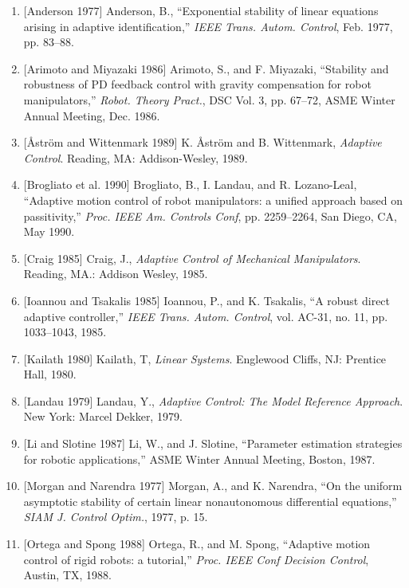 \documentclass[12pt,a4paper]{ctexart}
\begin{document}
\begin{enumerate}
\item {[Anderson 1977]} Anderson, B., ``Exponential stability of linear equations arising in adaptive identification,'' \textit{IEEE Trans. Autom. Control}, Feb. 1977, pp. 83--88.

\item {[Arimoto and Miyazaki 1986]} Arimoto, S., and F. Miyazaki, ``Stability and robustness of PD feedback control with gravity compensation for robot manipulators,'' \textit{Robot. Theory Pract.}, DSC Vol. 3, pp. 67--72, ASME Winter Annual Meeting, Dec. 1986.

\item {[Åström and Wittenmark 1989]} K. Åström and B. Wittenmark, \textit{Adaptive Control}. Reading, MA: Addison-Wesley, 1989.

\item {[Brogliato et al. 1990]} Brogliato, B., I. Landau, and R. Lozano-Leal, ``Adaptive motion control of robot manipulators: a unified approach based on passitivity,'' \textit{Proc. IEEE Am. Controls Conf}, pp. 2259--2264, San Diego, CA, May 1990.

\item {[Craig 1985]} Craig, J., \textit{Adaptive Control of Mechanical Manipulators}. Reading, MA.: Addison Wesley, 1985.

\item {[Ioannou and Tsakalis 1985]} Ioannou, P., and K. Tsakalis, ``A robust direct adaptive controller,'' \textit{IEEE Trans. Autom. Control}, vol. AC-31, no. 11, pp. 1033--1043, 1985.

\item {[Kailath 1980]} Kailath, T, \textit{Linear Systems}. Englewood Cliffs, NJ: Prentice Hall, 1980.

\item {[Landau 1979]} Landau, Y., \textit{Adaptive Control: The Model Reference Approach}. New York: Marcel Dekker, 1979.

\item {[Li and Slotine 1987]} Li, W., and J. Slotine, ``Parameter estimation strategies for robotic applications,'' ASME Winter Annual Meeting, Boston, 1987.

\item {[Morgan and Narendra 1977]} Morgan, A., and K. Narendra, ``On the uniform asymptotic stability of certain linear nonautonomous differential equations,'' \textit{SIAM J. Control Optim.}, 1977, p. 15.

\item {[Ortega and Spong 1988]} Ortega, R., and M. Spong, ``Adaptive motion control of rigid robots: a tutorial,'' \textit{Proc. IEEE Conf Decision Control}, Austin, TX, 1988.


\end{enumerate}
\end{document}
